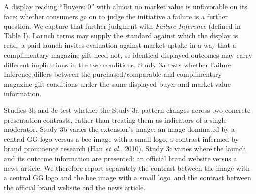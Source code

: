 \documentclass[12pt, a4paper]{article}
\begin{document}
A display reading ``Buyers: 0'' with almost no market value is unfavorable on its face; whether consumers go on to judge the initiative a failure is a further question. We capture that further judgment with \emph{Failure Inference} (defined in Table I). Launch terms may supply the standard against which the display is read: a paid launch invites evaluation against market uptake in a way that a complimentary magazine gift need not, so identical displayed outcomes may carry different implications in the two conditions. Study 3a tests whether Failure Inference differs between the purchased/comparable and complimentary magazine-gift conditions under the same displayed buyer and market-value information.

Studies 3b and 3c test whether the Study 3a pattern changes across two concrete presentation contrasts, rather than treating them as indicators of a single moderator. Study 3b varies the extension's image: an image dominated by a central GG logo versus a bee image with a small logo, a contrast informed by brand prominence research (Han \emph{et al.}, 2010). Study 3c varies where the launch and its outcome information are presented: an official brand website versus a news article. We therefore report separately the contrast between the image with a central GG logo and the bee image with a small logo, and the contrast between the official brand website and the news article.
\end{document}
